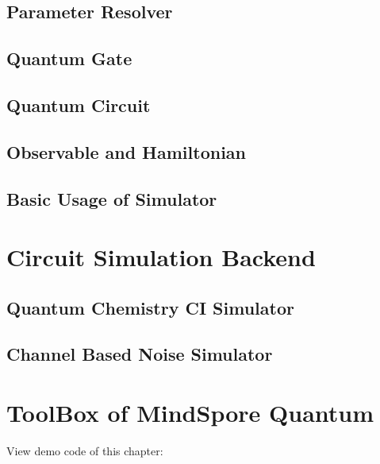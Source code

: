 \documentclass[pra,twocolumn,superscriptaddress,floatfix,nofootinbib,amsmath,amssymb]{revtex4-1}
\numberwithin{equation}{section}
\numberwithin{figure}{section}
\numberwithin{table}{section}
\begin{document}
\subsection{Parameter Resolver}


\subsection{Quantum Gate}


\subsection{Quantum Circuit}


\subsection{Observable and Hamiltonian}


\subsection{Basic Usage of Simulator}
\label{sec:sim_basic_usage}



\section{Circuit Simulation Backend}
\label{sec:backend}



\subsection{Quantum Chemistry CI Simulator}
\label{sec:mqchem}


\subsection{Channel Based Noise Simulator}


\section{ToolBox of MindSpore Quantum}
\label{sec:toolbox}

View demo code of this chapter:  \ 
\end{document}
